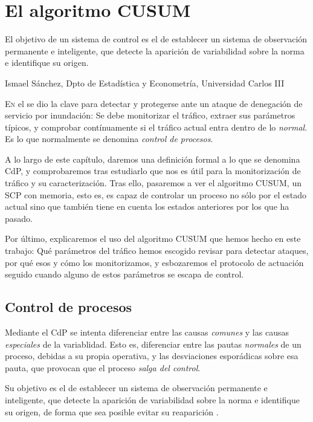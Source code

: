 \chapter{El algoritmo CUSUM}
\pagestyle{esitscCD}
\epigraph{ El objetivo de un sistema de control es el de establecer un sistema de observación permanente e 
inteligente, que detecte la aparición de variabilidad sobre la norma e identifique su origen. }{Ismael Sánchez, Dpto de 
Estadística y Econometría, Universidad Carlos III}

\lettrine[lraise=-0.1, lines=2, loversize=0.25]{E}n el  se dio la clave para detectar y 
protegerse ante un ataque de denegación de servicio por inundación: Se debe monitorizar el tráfico, extraer sus 
parámetros típicos, y comprobar contínuamente si el tráfico actual entra dentro de lo \emph{normal}. Es lo que 
normalmente se denomina \emph{control de procesos}.

A lo largo de este capítulo, daremos una definición formal a lo que se denomina \gls{CdP}, y comprobaremos tras 
estudiarlo  que nos es útil para la monitorización de tráfico y su caracterización. Tras ello, pasaremos a ver el 
algoritmo \gls{CUSUM}, un \gls{SCP} con memoria, esto es, es capaz de controlar un proceso no sólo por el estado actual 
sino que también tiene en cuenta los estados anteriores por los que ha pasado.

Por último, explicaremos el uso del algoritmo \gls{CUSUM} que hemos hecho en este trabajo: Qué parámetros del tráfico 
hemos escogido revisar para detectar ataques, por qué esos y cómo los monitorizamos, y esbozaremos el protocolo de 
actuación seguido cuando alguno de estos parámetros se escapa de control.

\section{Control de procesos}

Mediante el \gls{CdP} se intenta diferenciar entre las causas \emph{comunes} y las causas 
\emph{especiales} de la variablidad. Esto es, diferenciar entre las pautas \emph{normales} de un proceso, debidas a su 
propia operativa, y las desviaciones esporádicas sobre esa pauta, que provocan que el proceso \emph{salga del control}.

Su objetivo es el de establecer un sistema de observación permanente e inteligente, que detecte la aparición de 
variabilidad sobre la norma e identifique su origen, de forma que sea posible evitar su reaparición 
\cite{Control_de_procesos}.

